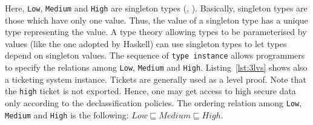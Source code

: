 Here, \texttt{Low}, \texttt{Medium} and \texttt{High} are singleton types (\cite{stone2000singleton}, \cite{pierce2005advanced}). Basically, singleton types are those which have only one value. Thus, the value of a singleton type has a unique type representing the value. A type theory allowing types to be parameterised by values (like the one adopted by Haskell) can use singleton types to let types depend on singleton values. The sequence of \texttt{type instance} allows programmers to specify the relations among \texttt{Low}, \texttt{Medium} and \texttt{High}. Listing~\ref{lst:3lvs} shows also a ticketing system instance. Tickets are generally used as a level proof. Note that the \texttt{high} ticket is not exported. Hence, one may get access to high secure data only according to the declassification policies. The ordering relation among \texttt{Low}, \texttt{Medium} and \texttt{High} is the following: $Low \sqsubseteq Medium \sqsubseteq High$.

